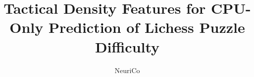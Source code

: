 \documentclass{article}
\title{Tactical Density Features for CPU-Only Prediction of Lichess Puzzle Difficulty}
\author{NeuriCo}
\begin{document}
\maketitle

\begin{abstract}

\end{abstract}









\end{document}
